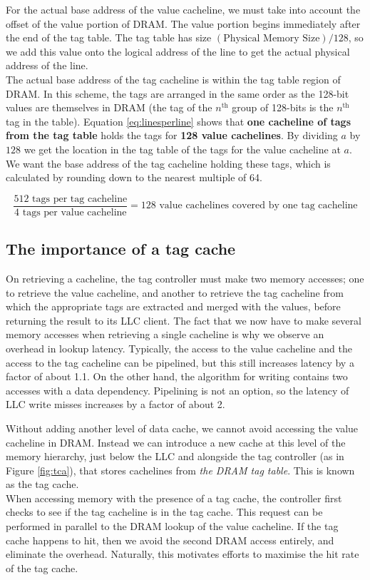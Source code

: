 For the actual base address of the value cacheline, we must take into account the offset of the value portion of DRAM. The value portion begins immediately after the end of the tag table. The tag table has size $\displaystyle (\text{Physical Memory Size})/128$, so we add this value onto the logical address of the line to get the actual physical address of the line.\\
The actual base address of the tag cacheline is within the tag table region of DRAM. In this scheme, the tags are arranged in the same order as the 128-bit values are themselves in DRAM (the tag of the $n^\text{th}$ group of 128-bits is the $n^\text{th}$ tag in the table). Equation \ref{eq:linesperline} shows that \textbf{one cacheline of tags from the tag table} holds the tags for \textbf{128 value cachelines}. By dividing $a$ by $128$ we get the location in the tag table of the tags for the value cacheline at $a$. We want the base address of the tag cacheline holding these tags, which is calculated by rounding down to the nearest multiple of 64.

\begin{equation} \label{eq:linesperline}
\frac{\text{512 tags per tag cacheline}}{\text{4 tags per value cacheline}} = \text{128 value cachelines covered by one tag cacheline}
\end{equation}

\subsection{The importance of a tag cache}
On retrieving a cacheline, the tag controller must make two memory accesses; one to retrieve the value cacheline, and another to retrieve the tag cacheline from which the appropriate tags are extracted and merged with the values, before returning the result to its LLC client. The fact that we now have to make several memory accesses when retrieving a single cacheline is why we observe an overhead in lookup latency. Typically, the access to the value cacheline and the access to the tag cacheline can be pipelined, but this still increases latency by a factor of about 1.1. On the other hand, the algorithm for writing contains two accesses with a data dependency. Pipelining is not an option, so the latency of LLC write misses increases by a factor of about 2.

Without adding another level of data cache, we cannot avoid accessing the value cacheline in DRAM. Instead we can introduce a new cache at this level of the memory hierarchy, just below the LLC and alongside the tag controller (as in Figure \ref{fig:tca}), that stores cachelines from \textit{the DRAM tag table}. This is known as the tag cache.\\
When accessing memory with the presence of a tag cache, the controller first checks to see if the tag cacheline is in the tag cache. This request can be performed in parallel to the DRAM lookup of the value cacheline. If the tag cache happens to hit, then we avoid the second DRAM access entirely, and eliminate the overhead. Naturally, this motivates efforts to maximise the hit rate of the tag cache.

